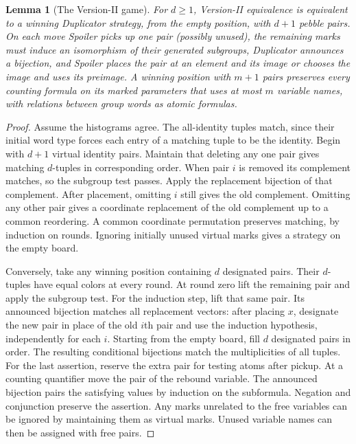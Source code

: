 \documentclass[11pt]{article}
\newtheorem{lemma}[theorem]{Lemma}
\theoremstyle{definition}
\theoremstyle{remark}
\numberwithin{equation}{section}
\begin{document}
\begin{lemma}[The Version-II game]\label{lem:paper-wl-game}
For $d\ge1$, Version-II equivalence is equivalent to a winning
Duplicator strategy, from the empty position, with $d+1$ pebble pairs.
On each move Spoiler picks up one pair (possibly unused), the remaining
marks must induce an isomorphism of their generated subgroups, Duplicator
announces a bijection, and Spoiler places the pair at an element and
its image or chooses the image and uses its preimage.
A winning position with $m+1$ pairs preserves every counting formula
on its marked parameters that uses at most $m$ variable names, with
relations between group words as atomic formulas.
\end{lemma}
\begin{proof}
Assume the histograms agree. The all-identity tuples match, since
their initial word type forces each entry of a matching tuple to be the
identity. Begin with $d+1$ virtual identity pairs. Maintain that deleting
any one pair gives matching $d$-tuples in corresponding order.
When pair $i$ is removed its complement matches, so the subgroup test
passes. Apply the replacement bijection of that complement. After
placement, omitting $i$ still gives the old complement. Omitting any
other pair gives a coordinate replacement of the old complement up to
a common reordering. A common coordinate permutation preserves matching,
by induction on rounds. Ignoring initially unused virtual marks gives a
strategy on the empty board.

Conversely, take any winning position containing $d$ designated pairs.
Their $d$-tuples have equal colors at every round. At round zero lift
the remaining pair and apply the subgroup test. For the induction step,
lift that same pair. Its announced bijection matches all replacement
vectors: after placing $x$, designate the new pair in place of the old
$i$th pair and use the induction hypothesis, independently for each
$i$. Starting from the empty board, fill $d$ designated pairs in
order. The resulting conditional bijections match the multiplicities
of all tuples. For the last assertion, reserve the extra pair for
testing atoms after pickup. At a counting quantifier move the pair of
the rebound variable. The announced bijection pairs the satisfying
values by induction on the subformula. Negation and conjunction
preserve the assertion. Any marks unrelated to the free variables
can be ignored by maintaining them as virtual marks. Unused variable
names can then be assigned with free pairs.
\end{proof}
\end{document}
